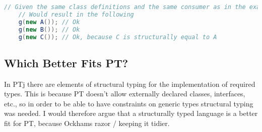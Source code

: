 \begin{lstlisting}[label={lst:structural-typing-example2}, language=Java]
    // Given the same class definitions and the same consumer as in the example above.
    // Would result in the following
    g(new A()); // Ok
    g(new B()); // Ok
    g(new C()); // Ok, because C is structurally equal to A
\end{lstlisting}

\subsection{Which Better Fits PT?}\label{subsec:which-better-fits-pt?}

In PTj there are elements of structural typing for the implementation of required types.
This is because PT doesn't allow externally declared classes, interfaces, etc., so in order to be able to have constraints on generic types structural typing was needed.
I would therefore argue that a structurally typed language is a better fit for PT, because Ockhams razor / keeping it tidier.

